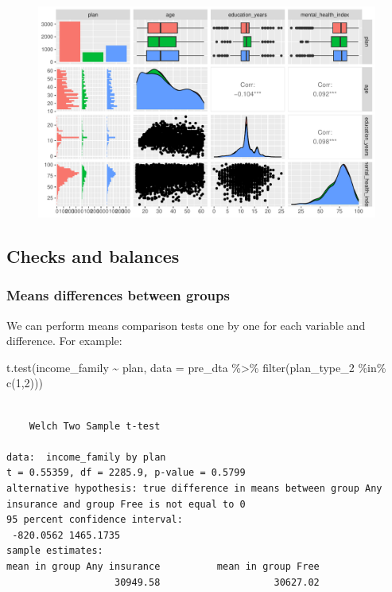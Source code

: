 \documentclass[
  letterpaper,
  DIV=11,
  numbers=noendperiod]{scrartcl}
\newenvironment{Shaded}{\begin{snugshade}}{\end{snugshade}}
\newcommand{\AttributeTok}[1]{\textcolor[rgb]{0.40,0.45,0.13}{#1}}
\newcommand{\DecValTok}[1]{\textcolor[rgb]{0.68,0.00,0.00}{#1}}
\newcommand{\FunctionTok}[1]{\textcolor[rgb]{0.28,0.35,0.67}{#1}}
\newcommand{\NormalTok}[1]{\textcolor[rgb]{0.00,0.23,0.31}{#1}}
\newcommand{\SpecialCharTok}[1]{\textcolor[rgb]{0.37,0.37,0.37}{#1}}
\begin{document}
\begin{figure}[H]

{\centering \includegraphics{RCT-RAND-HIE-part-2_files/figure-pdf/unnamed-chunk-14-1.pdf}

}

\end{figure}

\hypertarget{checks-and-balances}{%
\subsection{Checks and balances}\label{checks-and-balances}}

\hypertarget{means-differences-between-groups}{%
\subsubsection{Means differences between
groups}\label{means-differences-between-groups}}

We can perform means comparison tests one by one for each variable and
difference. For example:

\begin{Shaded}
\begin{Highlighting}[]
\FunctionTok{t.test}\NormalTok{(income\_family }\SpecialCharTok{\textasciitilde{}}\NormalTok{ plan, }\AttributeTok{data =}\NormalTok{ pre\_dta }\SpecialCharTok{\%\textgreater{}\%} \FunctionTok{filter}\NormalTok{(plan\_type\_2 }\SpecialCharTok{\%in\%} \FunctionTok{c}\NormalTok{(}\DecValTok{1}\NormalTok{,}\DecValTok{2}\NormalTok{)))}
\end{Highlighting}
\end{Shaded}

\begin{verbatim}

    Welch Two Sample t-test

data:  income_family by plan
t = 0.55359, df = 2285.9, p-value = 0.5799
alternative hypothesis: true difference in means between group Any insurance and group Free is not equal to 0
95 percent confidence interval:
 -820.0562 1465.1735
sample estimates:
mean in group Any insurance          mean in group Free 
                   30949.58                    30627.02 
\end{verbatim}
\end{document}
